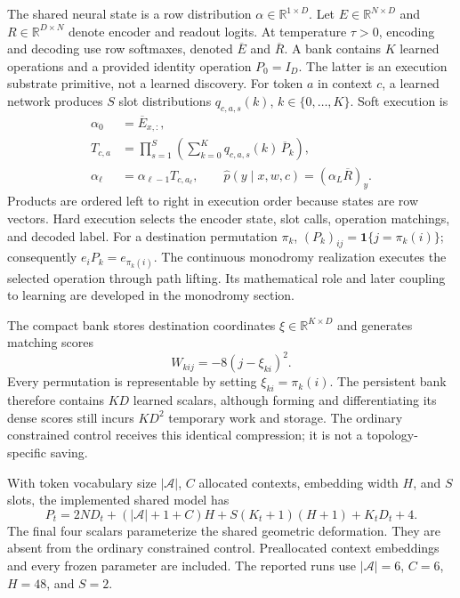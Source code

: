 The shared neural state is a row distribution $\alpha\in\mathbb{R}^{1\times D}$.
Let $E\in\mathbb{R}^{N\times D}$ and $R\in\mathbb{R}^{D\times N}$ denote
encoder and readout logits. At temperature $\tau>0$, encoding and decoding use
row softmaxes, denoted $\overline E$ and $\overline R$. A bank contains $K$
learned operations and a provided identity operation $P_0=I_D$. The latter is an
execution substrate primitive, not a learned discovery. For token $a$ in context
$c$, a learned network produces $S$ slot distributions
$q_{c,a,s}(k)$, $k\in\{0,\ldots,K\}$. Soft execution is
\begin{align}
 \alpha_0 &= \overline E_{x,:},\\
 T_{c,a} &= \prod_{s=1}^{S}\left(\sum_{k=0}^{K}
                    q_{c,a,s}(k)\,\overline P_k\right),\\
 \alpha_{\ell} &= \alpha_{\ell-1}T_{c,a_\ell},
 \qquad \widehat p(y\mid x,w,c)=(\alpha_L\overline R)_y.
 \label{eq:growth-soft-execution}
\end{align}
Products are ordered left to right in execution order because states are row
vectors. Hard execution selects the encoder state, slot calls, operation
matchings, and decoded label. For a destination permutation $\pi_k$,
$(P_k)_{ij}=\mathbf{1}\{j=\pi_k(i)\}$; consequently $e_iP_k=e_{\pi_k(i)}$.
The continuous monodromy realization executes the selected operation through
path lifting. Its mathematical role and later coupling to learning are
developed in the monodromy section.

The compact bank stores destination coordinates
$\xi\in\mathbb{R}^{K\times D}$ and generates matching scores
\begin{equation}
 W_{kij}=-8(j-\xi_{ki})^2.
 \label{eq:compact-destination-scores}
\end{equation}
Every permutation is representable by setting $\xi_{ki}=\pi_k(i)$.
The persistent bank therefore contains $KD$ learned scalars, although forming
and differentiating its dense scores still incurs $KD^2$ temporary work and
storage. The ordinary constrained control receives this identical compression;
it is not a topology-specific saving.

With token vocabulary size $|\mathcal A|$, $C$ allocated contexts, embedding
width $H$, and $S$ slots, the implemented shared model has
\begin{equation}
 P_t=2ND_t+(|\mathcal A|+1+C)H
       +S(K_t+1)(H+1)+K_tD_t+4.
 \label{eq:growth-parameter-count}
\end{equation}
The final four scalars parameterize the shared geometric deformation. They are
absent from the ordinary constrained control. Preallocated context embeddings
and every frozen parameter are included. The reported runs use
$|\mathcal A|=6$, $C=6$, $H=48$, and $S=2$.

